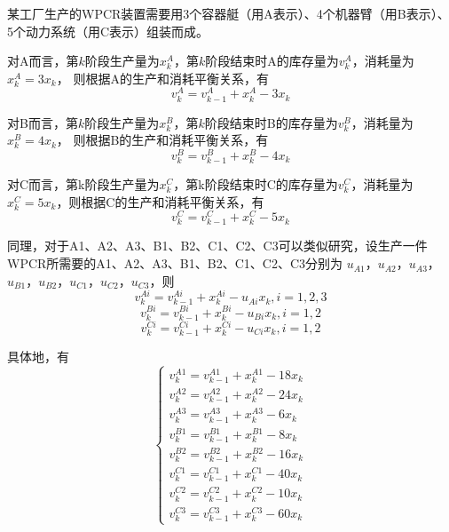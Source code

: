 某工厂生产的WPCR装置需要用3个容器艇（用A表示）、4个机器臂（用B表示）、5个动力系统（用C表示）组装而成。

对A而言，第$k$阶段生产量为$x_k^A$，第$k$阶段结束时A的库存量为$v_k^A$，消耗量为$x_k^A=3x_k$，
则根据A的生产和消耗平衡关系，有
\begin{equation}
    v_k^A=v_{k-1}^A + x_k^A - 3x_k
\end{equation}

对B而言，第$k$阶段生产量为$x_k^B$，第$k$阶段结束时B的库存量为$v_k^B$，消耗量为$x_k^B=4x_k$，
则根据B的生产和消耗平衡关系，有
\begin{equation}
    v_k^B=v_{k-1}^B + x_k^B - 4x_k
\end{equation}

对C而言，第k阶段生产量为$x_k^C$，第k阶段结束时C的库存量为$v_k^C$，消耗量为$x_k^C=5x_k$，则根据C的生产和消耗平衡关系，有
\begin{equation}
    v_k^C=v_{k-1}^C + x_k^C - 5x_k
\end{equation}

同理，对于A1、A2、A3、B1、B2、C1、C2、C3可以类似研究，设生产一件WPCR所需要的A1、A2、A3、B1、B2、C1、C2、C3分别为
$u_{A1}$，$u_{A2}$，$u_{A3}$，$u_{B1}$，$u_{B2}$，$u_{C1}$，$u_{C2}$，$u_{C3}$，则
\begin{equation}
    v_k^{Ai}=v_{k-1}^{Ai} + x_k^{Ai} - u_{Ai}x_k,i=1,2,3
\end{equation}
\begin{equation}
    v_k^{Bi}=v_{k-1}^{Bi} + x_k^{Bi} - u_{Bi}x_k,i=1,2
\end{equation}
\begin{equation}
    v_k^{Ci}=v_{k-1}^{Ci} + x_k^{Ci} - u_{Ci}x_k,i=1,2
\end{equation}

具体地，有
\begin{equation}
    \begin{cases}
        v_k^{A1}=v_{k-1}^{A1} + x_k^{A1} - 18x_k \\ 
        v_k^{A2}=v_{k-1}^{A2} + x_k^{A2} - 24x_k \\ 
        v_k^{A3}=v_{k-1}^{A3} + x_k^{A3} - 6x_k \\ 
        v_k^{B1}=v_{k-1}^{B1} + x_k^{B1} - 8x_k \\ 
        v_k^{B2}=v_{k-1}^{B2} + x_k^{B2} - 16x_k \\ 
        v_k^{C1}=v_{k-1}^{C1} + x_k^{C1} - 40x_k \\ 
        v_k^{C2}=v_{k-1}^{C2} + x_k^{C2} - 10x_k \\ 
        v_k^{C3}=v_{k-1}^{C3} + x_k^{C3} - 60x_k
    \end{cases}
\end{equation}

